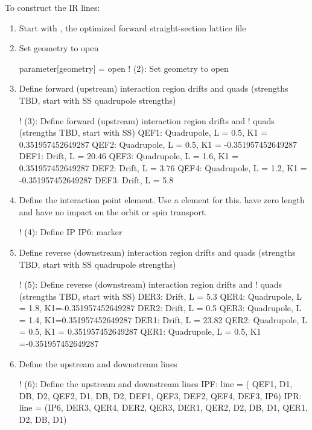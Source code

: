 \documentclass{hitec}     %
\begin{document}
{To construct the IR lines:

\begin{enumerate}[leftmargin=*]
    \item Start with , the optimized forward straight-section lattice file
    \item Set geometry to open
    \begin{code}
parameter[geometry] = open   ! (2): Set geometry to open  
    \end{code}
    \item Define forward (upstream) interaction region drifts and quads (strengths TBD, start with SS quadrupole strengths)
    \begin{code}
! (3): Define forward (upstream) interaction region drifts and 
!       quads (strengths TBD, start with SS)
QEF1: Quadrupole, L = 0.5, K1 = 0.351957452649287
QEF2: Quadrupole, L = 0.5, K1 = -0.351957452649287
DEF1: Drift, L = 20.46
QEF3: Quadrupole, L = 1.6, K1 = 0.351957452649287
DEF2: Drift, L = 3.76
QEF4: Quadrupole, L = 1.2, K1 = -0.351957452649287
DEF3: Drift, L = 5.8 
    \end{code}
    \item Define the interaction point element. Use a  element for this.  have zero length and have no impact on the orbit or spin transport.

    \begin{code}
! (4): Define IP
IP6: marker

    \end{code}
    \item Define reverse (downstream) interaction region drifts and quads (strengths TBD, start with SS quadrupole strengths)
    \begin{code}
! (5): Define reverse (downstream) interaction region drifts and 
!       quads (strengths TBD, start with SS)
DER3: Drift, L = 5.3
QER4: Quadrupole, L = 1.8, K1=-0.351957452649287
DER2: Drift, L = 0.5
QER3: Quadrupole, L = 1.4, K1=0.351957452649287
DER1: Drift, L = 23.82
QER2: Quadrupole, L = 0.5, K1 = 0.351957452649287
QER1: Quadrupole, L = 0.5, K1 =-0.351957452649287
    \end{code}
    \item Define the upstream and downstream lines
        \begin{code}
! (6): Define the upstream and downstream lines
IPF: line = ( QEF1, D1, DB, D2, QEF2, D1, DB, 
              D2, DEF1, QEF3, DEF2, QEF4, DEF3, IP6)
IPR: line = (IP6, DER3, QER4, DER2, QER3, DER1,
             QER2, D2, DB, D1, QER1, D2, DB, D1)
    \end{code}
\end{enumerate}

}
\end{document}
